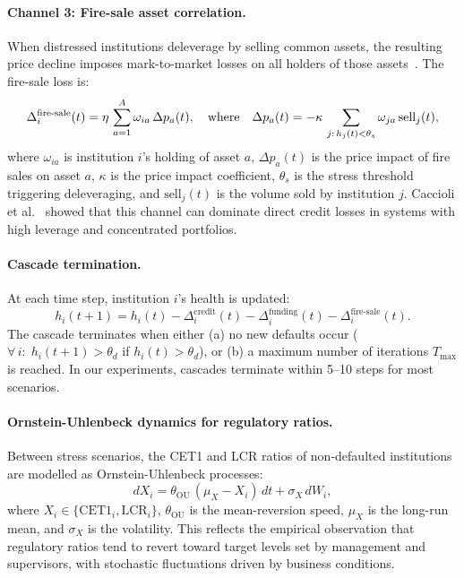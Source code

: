 \paragraph{Channel 3: Fire-sale asset correlation.}
When distressed institutions deleverage by selling common assets, the
resulting price decline imposes mark-to-market losses on all holders of
those assets~\cite{caccioli2015overlapping}.  The fire-sale loss is:
\begin{equation}
\Delta_i^{\text{fire\text{-}sale}}(t) = \eta\,\sum_{a=1}^{A}
\omega_{ia}\,\Delta p_a(t),
\quad\text{where}\quad
\Delta p_a(t) = -\kappa\,\sum_{j:\,h_j(t) < \theta_s}
\omega_{ja}\,\text{sell}_j(t),
\label{eq:firesale_loss}
\end{equation}
where $\omega_{ia}$ is institution $i$'s holding of asset $a$,
$\Delta p_a(t)$ is the price impact of fire sales on asset $a$,
$\kappa$ is the price impact coefficient, $\theta_s$ is the stress
threshold triggering deleveraging, and $\text{sell}_j(t)$ is the volume
sold by institution $j$.  Caccioli et al.~\cite{caccioli2015overlapping}
showed that this channel can dominate direct credit losses in systems
with high leverage and concentrated portfolios.

\paragraph{Cascade termination.}
At each time step, institution $i$'s health is updated:
\begin{equation}
h_i(t+1) = h_i(t) - \Delta_i^{\text{credit}}(t) -
\Delta_i^{\text{funding}}(t) - \Delta_i^{\text{fire-sale}}(t).
\label{eq:health_update}
\end{equation}
The cascade terminates when either (a) no new defaults occur
($\forall\, i:\; h_i(t+1) > \theta_d$ if $h_i(t) > \theta_d$), or (b) a
maximum number of iterations $T_{\max}$ is reached.  In our experiments,
cascades terminate within 5--10 steps for most scenarios.

\paragraph{Ornstein-Uhlenbeck dynamics for regulatory ratios.}
Between stress scenarios, the CET1 and LCR ratios of non-defaulted
institutions are modelled as Ornstein-Uhlenbeck processes:
\begin{equation}
dX_i = \theta_{\text{OU}}\,(\mu_X - X_i)\,dt + \sigma_X\,dW_i,
\label{eq:ou_dynamics}
\end{equation}
where $X_i \in \{\text{CET1}_i, \text{LCR}_i\}$, $\theta_{\text{OU}}$
is the mean-reversion speed, $\mu_X$ is the long-run mean, and
$\sigma_X$ is the volatility.  This reflects the empirical observation
that regulatory ratios tend to revert toward target levels set by
management and supervisors, with stochastic fluctuations driven by
business conditions.



